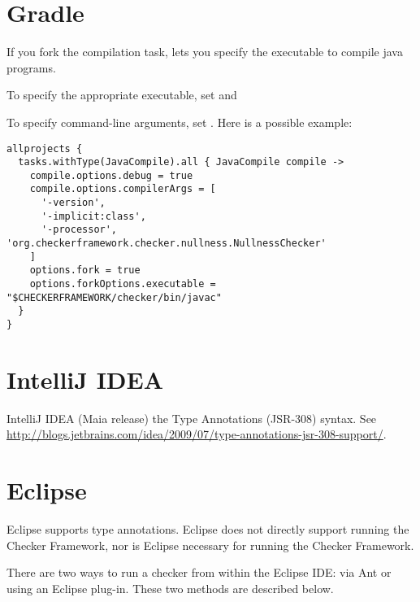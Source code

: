 \section{Gradle\label{gradle}}


If you fork the compilation task, 
lets you specify the executable to compile java programs.

To specify the appropriate executable, set
 and

To specify command-line arguments, set
.  Here is a possible example:

\begin{Verbatim}
allprojects {
  tasks.withType(JavaCompile).all { JavaCompile compile ->
    compile.options.debug = true
    compile.options.compilerArgs = [
      '-version',
      '-implicit:class',
      '-processor', 'org.checkerframework.checker.nullness.NullnessChecker'
    ]
    options.fork = true
    options.forkOptions.executable = "$CHECKERFRAMEWORK/checker/bin/javac"
  }
}
\end{Verbatim}



\section{IntelliJ IDEA\label{intellij}}

IntelliJ IDEA (Maia release)
the Type Annotations (JSR-308) syntax.
See \url{http://blogs.jetbrains.com/idea/2009/07/type-annotations-jsr-308-support/}.

\section{Eclipse\label{eclipse}}

Eclipse supports type annotations.
Eclipse does not directly support running the Checker Framework, 
nor is Eclipse necessary for running the Checker Framework.

There are two ways to run a checker from within the Eclipse IDE:  via Ant
or using an Eclipse plug-in.  These two methods are described below.

